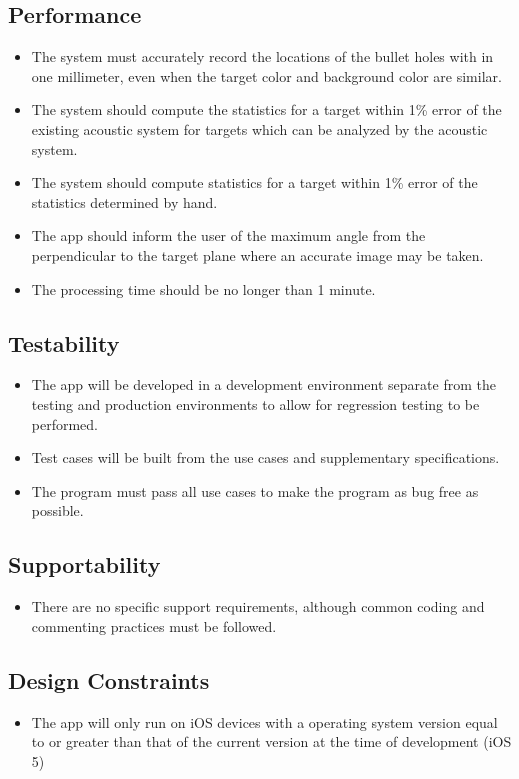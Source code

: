 \subsection{Performance}
\begin{itemize}
\item The system must accurately record the locations of the bullet holes with in one millimeter, even when the target color and background color are similar.
\item The system should compute the statistics for a target within 1\% error of the existing acoustic system for targets which can be analyzed by the acoustic system.
\item The system should compute statistics for a target within 1\% error of the statistics determined by hand.
\item The app should inform the user of the maximum angle from the perpendicular to the target plane where an accurate image may be taken.
\item The processing time should be no longer than 1 minute.
\end{itemize}
\subsection{Testability}
\begin{itemize}
\item The app will be developed in a development environment separate from the testing and production environments to allow for regression testing to be performed.
\item Test cases will be built from the use cases and supplementary specifications.
\item The program must pass all use cases to make the program as bug free as possible.
\end{itemize}
\subsection{Supportability}
\begin{itemize}
\item There are no specific support requirements, although common coding and commenting practices must be followed.
\end{itemize}
\subsection{Design Constraints}
\begin{itemize}
\item The app will only run on iOS devices with a operating system version equal to or greater than that of the current version at the time of development (iOS 5)
\end{itemize}
